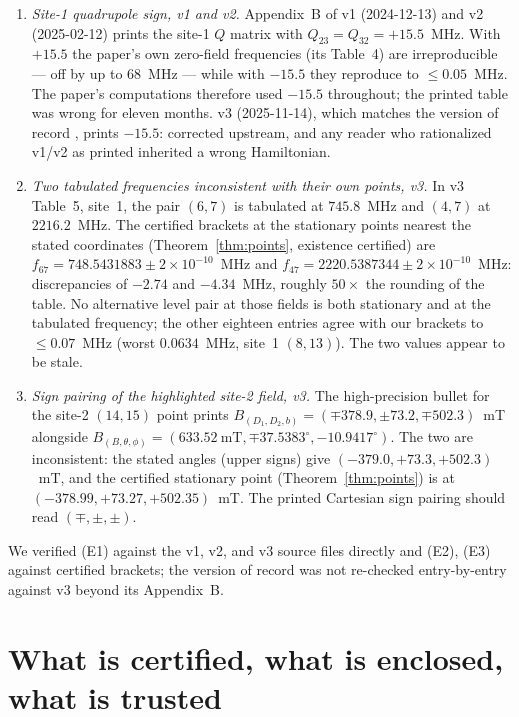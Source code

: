 \documentclass[11pt]{amsart}
\theoremstyle{plain}
\theoremstyle{definition}
\theoremstyle{remark}
\begin{document}
\begin{enumerate}
\item[(E1)] \emph{Site-1 quadrupole sign, v1 and v2.}  Appendix~B of v1
(2024-12-13) and v2 (2025-02-12) prints the site-1 $Q$ matrix with
$Q_{23}=Q_{32}=+15.5$~MHz.  With $+15.5$ the paper's own zero-field
frequencies (its Table~4) are irreproducible --- off by up to $68$~MHz ---
while with $-15.5$ they reproduce to $\le0.05$~MHz.  The paper's computations
therefore used $-15.5$ throughout; the printed table was wrong for eleven
months.  v3 (2025-11-14), which matches the version of record
\cite{MatsuuraPRB}, prints $-15.5$: corrected upstream, and any reader who
rationalized v1/v2 as printed inherited a wrong Hamiltonian.
\item[(E2)] \emph{Two tabulated frequencies inconsistent with their own
points, v3.}  In v3 Table~5, site~1, the pair $(6,7)$ is tabulated at
$745.8$~MHz and $(4,7)$ at $2216.2$~MHz.  The certified brackets at the
stationary points nearest the stated coordinates (Theorem~\ref{thm:points},
existence certified) are
$f_{67}=748.5431883\pm2\times10^{-10}$~MHz and
$f_{47}=2220.5387344\pm2\times10^{-10}$~MHz: discrepancies of $-2.74$ and
$-4.34$~MHz, roughly $50\times$ the rounding of the table.  No alternative
level pair at those fields is both stationary and at the tabulated frequency;
the other eighteen entries agree with our brackets to $\le0.07$~MHz (worst
$0.0634$~MHz, site~1 $(8,13)$).  The two values appear to be stale.
\item[(E3)] \emph{Sign pairing of the highlighted site-2 field, v3.}  The
high-precision bullet for the site-2 $(14,15)$ point prints
$B_{(D_1,D_2,b)}=(\mp378.9,\pm73.2,\mp502.3)$~mT alongside
$B_{(B,\theta,\phi)}=(633.52~\mathrm{mT},\mp37.5383^\circ,-10.9417^\circ)$.
The two are inconsistent: the stated angles (upper signs) give
$(-379.0,+73.3,+502.3)$~mT, and the certified stationary point
(Theorem~\ref{thm:points}) is at $(-378.99,+73.27,+502.35)$~mT.  The printed
Cartesian sign pairing should read $(\mp,\pm,\pm)$.
\end{enumerate}

We verified (E1) against the v1, v2, and v3 source files directly and (E2),
(E3) against certified brackets; the version of record \cite{MatsuuraPRB} was
not re-checked entry-by-entry against v3 beyond its Appendix~B.

\section{What is certified, what is enclosed, what is
trusted}\label{sec:trust}
\end{document}

